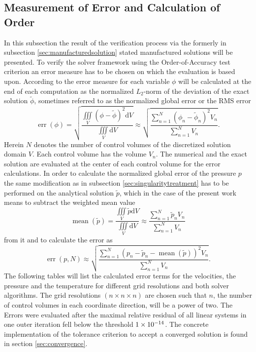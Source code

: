 \subsection{Measurement of Error and Calculation of Order}

In this subsection the result of the verification process via the formerly in subsection \ref{sec:manufacturedsolution} stated manufactured solutions will be presented. To verify the solver framework using the Order-of-Accuracy test criterion an error measure has to be chosen on which the evaluation is based upon. According to \cite{salari00} the error measure for each variable \(\phi\) will be calculated at the end of each computation as the normalized \(L_2\)-norm of the deviation of the exact solution \(\tilde{\phi}\), sometimes referred to as the normalized global error or the RMS error
\begin{displaymath}
  \operatorname{err}(\phi) = \sqrt{ \frac {\iiint\limits_V \left( \phi - \tilde{\phi} \right)^2 \mathrm{d}V }{\iiint\limits_V \mathrm{d}V }} \approx \sqrt{ \frac{ \sum_{n=1}^N \left(\phi_n - \tilde{\phi}_n \right)^2 V_n }{\sum_{n=1}^{N} V_n}} .
\end{displaymath}
Herein \(N\) denotes the number of control volumes of the discretized solution domain \(V\). Each control volume has the volume \(V_n\). The numerical and the exact solution are evaluated at the center of each control volume for the error calculations. In order to calculate the normalized global error of the pressure \(p\) the same modification as in subsection \ref{sec:singularitytreatment} has to be performed on the analytical solution \(\tilde{p}\), which in the case of the present work means to subtract the weighted mean value
\begin{displaymath}
  \operatorname{mean}\left( \tilde{p} \right) = \frac{\iiint\limits_V \tilde{p} \mathrm{d}V}{\iiint\limits_V \mathrm{d}V} \approx \frac{\sum_{n=1}^N \tilde{p}_n V_n}{\sum_{n=1}^N V_n}
\end{displaymath}
from it and to calculate the error as
\begin{displaymath}
  \operatorname{err}(p,N) \approx \sqrt{ \frac{ \sum_{n=1}^N \left(p_n - \tilde{p}_n -\operatorname{mean}\left(\tilde{p}\right) \right)^2 V_n }{\sum_{n=1}^{N} V_n}} .
\end{displaymath}
The following tables will list the calculated error terms for the velocities, the pressure and the temperature for different grid resolutions and both solver algorithms. The grid resolutions \((n \times n \times n)\) are chosen such that \(n\), the number of control volumes in each coordinate direction, will be a power of two. The Errors were evaluated after the maximal relative residual of all linear systems in one outer iteration fell below the threshold \(1\times 10^{-14}\). The concrete implementation of the tolerance criterion to accept a converged solution is found in section \ref{sec:convergence}.

